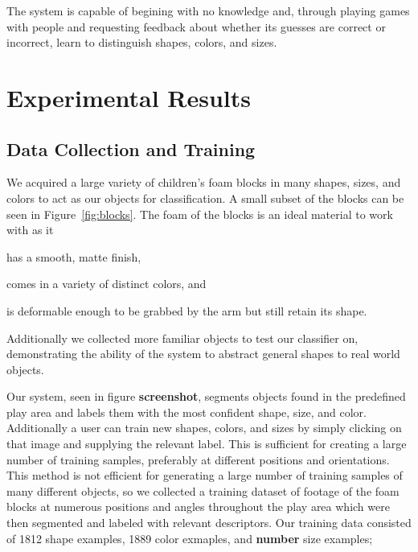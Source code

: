 \documentclass[11pt]{article}
\newcommand{\meh}[1]{{\bf \color{blue} #1}}
\begin{document}
{The system is capable of begining with no knowledge and, through playing games
with people and requesting feedback about whether its guesses are correct or
incorrect, learn to distinguish shapes, colors, and sizes.

\section{Experimental Results}

\subsection{Data Collection and Training}
We acquired a large variety of children's foam blocks in many shapes, sizes,
and colors to act as our objects for classification. A small subset of the
blocks can be seen in Figure~\ref{fig:blocks}. The foam of the blocks is an
ideal material to work with as it
\begin{inparaenum}[(1)]
\item has a smooth, matte finish,
\item comes in a variety of distinct colors, and
\item is deformable enough to be grabbed by the arm but still retain its
shape.
\end{inparaenum}
Additionally we collected
more familiar objects to test our classifier on, demonstrating the ability of
the system to abstract general shapes to real world objects.

Our system, seen in figure \meh{screenshot}, segments objects found in the
predefined play area and labels them with the most confident shape, size, and
color.  Additionally a user can train new shapes, colors, and sizes by simply
clicking on that image and supplying the relevant label.  This is sufficient
for creating a large number of training samples, preferably at different
positions and orientations.  This method is not efficient for generating a
large number of training samples of many different objects, so we collected a
training dataset of footage of the foam blocks at numerous positions and angles
throughout the play area which were then segmented and labeled with relevant
descriptors.  Our training data consisted of 1812 shape examples, 1889 color exmaples, and \meh{number} size examples;


}
\end{document}
